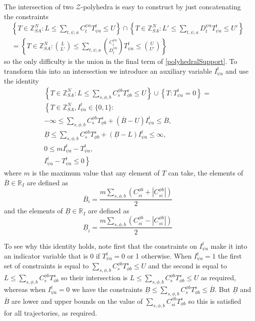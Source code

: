 \documentclass{article}
\begin{document}
The intersection of two $\mathcal{Z}$-polyhedra is easy to construct by just concatenating the constraints
\begin{multline}
\left\{ T\in\mathbb{\mathbb{Z}}^N_{SA} : L \le \sum_{t,\psi,a} C^{\psi a}_{t} T^t_{\psi a} \le U \right\}
\cap \left\{ T\in\mathbb{\mathbb{Z}}^N_{SA} : L' \le \sum_{t,\psi,a} D^{\psi a}_{t} T^t_{\psi a} \le U' \right\} \\
= \left\{ T\in\mathbb{\mathbb{Z}}^N_{SA} : {L \choose L'}  \le \sum_{t,\psi,a} {C^{\psi a}_t\choose D^{\psi a}_t} T^t_{\psi a} \le {U\choose U'} \right\}
\end{multline}
so the only difficulty is the union in the final term of \eqref{polyhedralSupport}. To transform this into an intersection we introduce an auxiliary variable $I^t_{\psi a}$ and use the identity
\begin{multline}
\left\{ T\in\mathbb{Z}^N_{SA} : L \le \sum_{s,\phi,b} C^{\phi b}_{s} T^s_{\phi b} \le U \right\}
\cup
\left\{T: T^t_{\psi a} = 0\right\}
=\\
\left\{
T\in\mathbb{Z}^N_{SA}, I^t_{\psi a}\in\{0,1\}:\right.\\
-\infty \le \sum_{s,\phi,b} C^{\phi b}_{s} T^s_{\phi b}
+
(\overline{B}-U)I^{t}_{\psi a}
\le \overline{B},\\
\underline{B} \le \sum_{s,\phi,b} C^{\phi b}_{s} T^s_{\phi b}
+
(\underline{B}-L)I^{t}_{\psi a} \le \infty,\\
0 \le mI^t_{\psi a} - T^t_{\psi a},\\
\left. I^t_{\psi a} - T^t_{\psi a} \le 0
\right\}
\label{implication}
\end{multline}
where $m$ is the maximum value that any element of $T$ can take, the elements of $\overline{B}\in\mathbb{R}_I$ are defined as
\[
\overline{B}_i = \frac{m\sum_{s,\phi,b} \left( C^{\phi b}_{si} + \left|C^{\phi b}_{si}\right|\right)}{2}
\]
and the elements of $\underline{B}\in\mathbb{R}_I$ are defined as
\[
\underline{B}_i = \frac{m\sum_{s,\phi,b} \left(C^{\phi b}_{si} - \left|C^{\phi b}_{si}\right|\right)}{2}
\]

To see why this identity holds, note first that the constraints on $I^t_{\psi a}$ make it into an indicator variable that is 0 if $T^t_{\psi a}=0$ or 1 otherwise. When $I^t_{\psi a}=1$ the first set of constraints is equal to $\sum_{s,\phi,b} C^{\phi b}_{s} T^s_{\phi b} \le U$ and the second is equal to $L \le \sum_{s,\phi,b} C^{\phi b}_{s} T^s_{\phi b}$ so their intersection is $L \le \sum_{s,\phi,b} C^{\phi b}_{s} T^s_{\phi b} \le U$ as required, whereas when $I^t_{\psi a}=0$ we have the constraints $\underline{B} \le \sum_{s,\phi,b} C^{\phi b}_{s} T^s_{\phi b} \le \overline{B}$. But $\underline{B}$ and $\overline{B}$ are lower and upper bounds on the value of $\sum_{s,\phi,b} C^{\phi b}_{si} T^s_{\phi b}$ so this is satisfied for all trajectories, as required.
\end{document}
